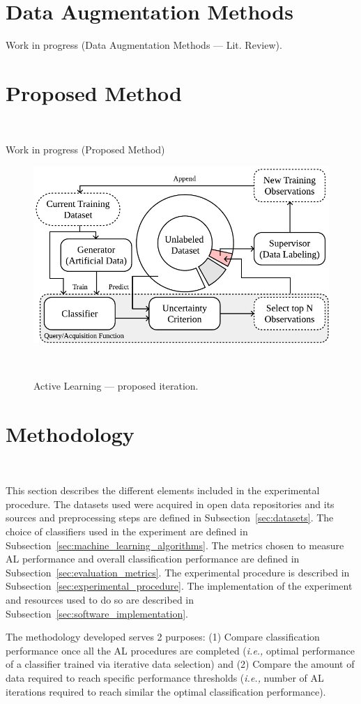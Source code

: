 \documentclass[parskip=full]{scrartcl}
\begin{document}
\section{Data Augmentation Methods}

Work in progress (Data Augmentation Methods --- Lit. Review).

\section{Proposed Method}~\label{sec:proposed_method}

Work in progress (Proposed Method)

\begin{figure}[H]
	\centering
	\includegraphics[width=.65\linewidth]{../analysis/al_proposed}
    \caption{%
        Active Learning --- proposed iteration.
    }~\label{fig:al_proposed}
\end{figure}


\section{Methodology}~\label{sec:methodology}

This section describes the different elements included in the experimental
procedure. The datasets used were acquired in open data repositories and its
sources and preprocessing steps are defined in Subsection~\ref{sec:datasets}.
The choice of classifiers used in the experiment are defined in
Subsection~\ref{sec:machine_learning_algorithms}. The metrics chosen to
measure AL performance and overall classification performance are defined in
Subsection~\ref{sec:evaluation_metrics}. The experimental procedure is
described in Subsection~\ref{sec:experimental_procedure}. The implementation
of the experiment and resources used to do so are described in
Subsection~\ref{sec:software_implementation}.

The methodology developed serves 2 purposes: (1) Compare classification
performance once all the AL procedures are completed (\textit{i.e.,} optimal
performance of a classifier trained via iterative data selection) and (2)
Compare the amount of data required to reach specific performance thresholds
(\textit{i.e.,} number of AL iterations required to reach similar the optimal
classification performance).
\end{document}
